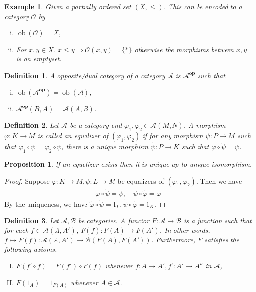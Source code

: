 \documentclass{article}
\newtheorem{proposition}{Proposition}[section]
\newtheorem{definition}{Definition}[section]
\newtheorem{example}{Example}[section]
\numberwithin{equation}{section}
\DeclareMathOperator{\ob}{ob}
\begin{document}
\begin{example}
Given a partially ordered set $(X,\leq)$. This can be encoded to a category $\mathcal{O}$ by
\begin{enumerate}[i).]
\item $\ob(\mathcal{O}) = X$,
\item For $x,y\in X$, $x\leq y\Rightarrow\mathcal{O}(x,y) = \{*\}$ otherwise the morphisms between $x,y$ is an emptyset.
\end{enumerate}
\end{example}

\begin{definition}
A opposite/dual category of a category $\mathcal{A}$ is $\mathcal{A}^{\textbf{op}}$ such that
\begin{enumerate}[i).]
\item $\ob(\mathcal{A}^{\textbf{op}})=\ob(\mathcal{A})$,
\item $\mathcal{A}^{\textbf{op}}(B,A) = \mathcal{A}(A,B)$.
\end{enumerate}
\end{definition}

\begin{definition}
Let $\mathcal{A}$ be a category and $\varphi_1,\varphi_2\in\mathcal{A}(M,N)$. A morphism $\varphi:K\to M$ is called an equalizer of $(\varphi_1,\varphi_2)$ if for any morphism $\psi:P\to M$ such that
$\varphi_1\circ\psi=\varphi_2\circ\psi$, there is a unique morphism $\tilde{\psi}:P\to K$ such that $\varphi\circ\tilde{\psi}=\psi$.
\end{definition}

\begin{proposition}
If an equalizer exists then it is unique up to unique isomorphism.
\end{proposition}

\begin{proof}
Suppose $\varphi:K\to M,\psi:L\to M$ be equalizers of $(\varphi_1,\varphi_2)$. Then we have
\begin{align*}
\varphi\circ\tilde{\psi}=\psi,\quad\psi\circ\tilde{\varphi}=\varphi
\end{align*}
By the uniqueness, we have $\tilde{\varphi}\circ\tilde{\psi} = 1_L,\tilde{\psi}\circ\tilde{\varphi} = 1_K$. 
\end{proof}

\begin{definition}
Let $\mathcal{A},\mathcal{B}$ be categories. A functor $F:\mathcal{A}\to\mathcal{B}$ is a function such that for each $f\in\mathcal{A}(A,A')$, $F(f):F(A)\to F(A')$. In other words, $f\mapsto F(f):\mathcal{A}(A,A')\to\mathcal{B}(F(A),F(A'))$. Furthermore, $F$ satisfies the following axioms.
\begin{enumerate}[I).]
\item $F(f'\circ f) = F(f')\circ F(f)$ whenever $f:A\to A',f':A'\to A''$ in $\mathcal{A}$,
\item $F(1_A) = 1_{F(A)}$ whenever $A\in\mathcal{A}$. 
\end{enumerate}
\end{definition}
\end{document}
